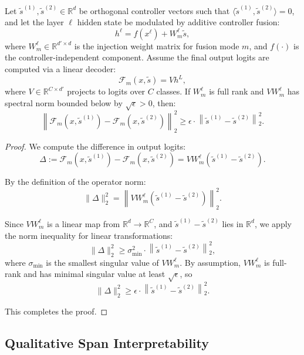 \begin{proposition}
\label{prop:orthogonal_fusion}
Let \(\tilde{s}^{(1)}, \tilde{s}^{(2)} \in \mathbb{R}^d\) be orthogonal controller vectors such that \(\langle \tilde{s}^{(1)}, \tilde{s}^{(2)} \rangle = 0\), and let the layer \(\ell\) hidden state be modulated by additive controller fusion:
\[
h^\ell = f(x^\ell) + W_m^\ell \tilde{s},
\]
where \(W_m^\ell \in \mathbb{R}^{d' \times d}\) is the injection weight matrix for fusion mode \(m\), and \(f(\cdot)\) is the controller-independent component. Assume the final output logits are computed via a linear decoder:
\[
\mathcal{F}_m(x, \tilde{s}) = V h^L,
\]
where \(V \in \mathbb{R}^{C \times d'}\) projects to logits over \(C\) classes. If \(W_m^\ell\) is full rank and \(V W_m^\ell\) has spectral norm bounded below by \(\sqrt{\epsilon} > 0\), then:
\[
\left\| \mathcal{F}_m(x, \tilde{s}^{(1)}) - \mathcal{F}_m(x, \tilde{s}^{(2)}) \right\|_2^2 \geq \epsilon \cdot \left\| \tilde{s}^{(1)} - \tilde{s}^{(2)} \right\|_2^2.
\]
\end{proposition}

\begin{proof}
We compute the difference in output logits:
\[
\Delta := \mathcal{F}_m(x, \tilde{s}^{(1)}) - \mathcal{F}_m(x, \tilde{s}^{(2)}) = V W_m^\ell (\tilde{s}^{(1)} - \tilde{s}^{(2)}).
\]

By the definition of the operator norm:
\[
\|\Delta\|_2^2 = \left\| V W_m^\ell (\tilde{s}^{(1)} - \tilde{s}^{(2)}) \right\|_2^2.
\]

Since \(V W_m^\ell\) is a linear map from \(\mathbb{R}^d \to \mathbb{R}^C\), and \(\tilde{s}^{(1)} - \tilde{s}^{(2)}\) lies in \(\mathbb{R}^d\), we apply the norm inequality for linear transformations:
\[
\| \Delta \|_2^2 \geq \sigma_{\min}^2 \cdot \left\| \tilde{s}^{(1)} - \tilde{s}^{(2)} \right\|_2^2,
\]
where \(\sigma_{\min}\) is the smallest singular value of \(V W_m^\ell\). By assumption, \(V W_m^\ell\) is full-rank and has minimal singular value at least \(\sqrt{\epsilon}\), so
\[
\| \Delta \|_2^2 \geq \epsilon \cdot \left\| \tilde{s}^{(1)} - \tilde{s}^{(2)} \right\|_2^2.
\]

This completes the proof.
\end{proof}

\subsection{Qualitative Span Interpretability}
\label{sec:qualitative-spans}

